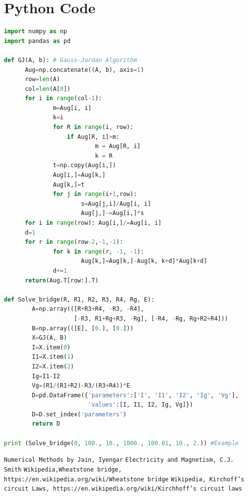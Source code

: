 \documentclass{article}
\begin{document}
\section{Python Code}
\begin{lstlisting}[language=Python, frame=single]
import numpy as np
import pandas as pd

def GJ(A, b): # Gauss-Jordan Algorithm
      Aug=np.concatenate((A, b), axis=1)
      row=len(A)
      col=len(A[0])
      for i in range(col-1):
              m=Aug[i, i]
              k=i
              for R in range(i, row):
                  if Aug[R, i]>m:
                          m = Aug[R, i]
                          k = R
              t=np.copy(Aug[i,])
              Aug[i,]=Aug[k,]
              Aug[k,]=t
              for j in range(i+1,row):
                      s=Aug[j,i]/Aug[i, i]
                      Aug[j,]-=Aug[i,]*s
      for i in range(row): Aug[i,]/=Aug[i, i]
      d=1
      for r in range(row-2,-1,-1):
              for k in range(r, -1, -1):
                      Aug[k,]=Aug[k,]-Aug[k, k+d]*Aug[k+d]
              d+=1
      return(Aug.T[row:].T)

def Solve_bridge(R, R1, R2, R3, R4, Rg, E):
        A=np.array(([R+R3+R4, -R3, -R4],
                    [-R3, R1+Rg+R3, -Rg], [-R4, -Rg, Rg+R2+R4]))
        B=np.array(([E], [0.], [0.]))
        X=GJ(A, B)
        I=X.item(0)
        I1=X.item(1)
        I2=X.item(2)
        Ig=I1-I2
        Vg=(R1/(R1+R2)-R3/(R3+R4))*E
        D=pd.DataFrame({'parameters':['I', 'I1', 'I2', 'Ig', 'Vg'],
                        'values':[I, I1, I2, Ig, Vg]})
        D=D.set_index('parameters')
        return D

print (Solve_bridge(0, 100., 10., 1000., 100.01, 10., 2.)) #Example
\end{lstlisting}
\begin{thebibliography}{9}
\texttt{Numerical Methods by Jain, Iyengar}
\texttt{Electricity and Magnetism, C.J. Smith}
\texttt{Wikipedia,Wheatstone bridge, https://en.wikipedia.org/wiki/Wheatstone bridge}
\texttt{Wikipedia, Kirchoff's circuit Laws, https://en.wikipedia.org/wiki/Kirchhoff's circuit laws}
\end{thebibliography}
\end{document}
